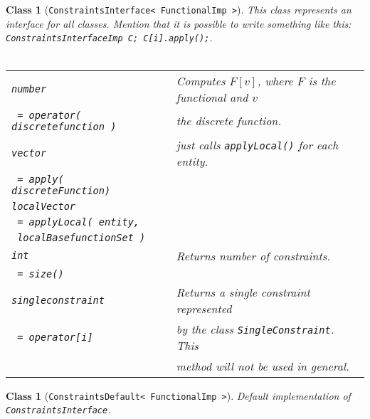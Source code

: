 \documentclass[a4paper,11pt]{article}
\numberwithin{equation}{section}
\newtheorem{class}[definition]{Class}
\newcommand{\theoremEndLine}{\hspace{1mm}}
\newcommand{\CodeT}[1]{\textnormal{\texttt{#1}}}
\begin{document}
	\begin{class}[\CodeT{ConstraintsInterface< FunctionalImp >}]
		This class represents an interface for all classes. Mention that it is possible to write something like this: \CodeT{ConstraintsInterfaceImp C; C[i].apply();}.
		\\\\
      \begin{tabular}{|l|l|}
        \hline
        \CodeT{number} & Computes $F[v]$, where $F$ is the functional and $v$\\
        \CodeT{ = operator( discretefunction )} & the discrete function.\\
        \hline
				\CodeT{vector} & just calls \CodeT{applyLocal()} for each entity.\\
				\CodeT{ = apply( discreteFunction) } & \\
				\hline
        \CodeT{localVector} & \\
        \CodeT{ = applyLocal( entity,} & \\
        \CodeT{ localBasefunctionSet )}  & \\         
        \hline
				\CodeT{int} & Returns number of constraints. \\
				\CodeT{ = size()} & \\  
				\hline
				\CodeT{singleconstraint} & Returns a single constraint represented\\
				\CodeT{ = operator[i]} & by the class \CodeT{SingleConstraint}. This \\
					& method will not be used in general.\\
				\hline
      \end{tabular}
    \end{class}\theoremEndLine

	\begin{class}[\CodeT{ConstraintsDefault< FunctionalImp >}]
		Default implementation of \CodeT{ConstraintsInterface}.		
  \end{class}\theoremEndLine
\end{document}
